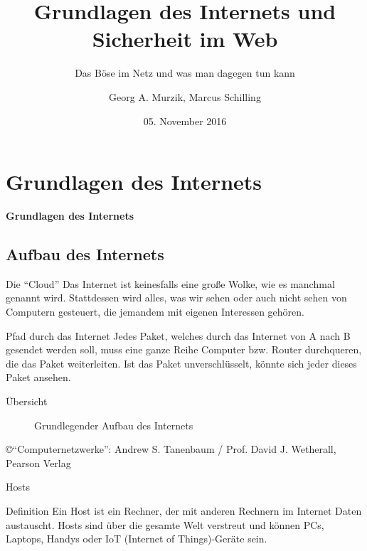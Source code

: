 \documentclass[hyperref={colorlinks,linkcolor=white}, utf8]{beamer}
\title{Grundlagen des Internets und Sicherheit im Web}
\subtitle{Das Böse im Netz und was man dagegen tun kann} %
\author{Georg A. Murzik, Marcus Schilling}
\institute{Terminal.21}
\date{05. November 2016}
\begin{document}
	\begin{frame}
		\titlepage
	\end{frame}
	
	
	\section{Grundlagen des Internets}
	\begin{frame}
		\centering \huge \textbf{Grundlagen des Internets}
	\end{frame}
	
	\subsection{Aufbau des Internets}
	\begin{frame}
		\begin{block}{Die \enquote{Cloud}}
			Das Internet ist keinesfalls eine große Wolke, wie es manchmal genannt wird. Stattdessen wird alles, was wir sehen oder auch nicht sehen von Computern gesteuert, die jemandem mit eigenen Interessen gehören.
		\end{block}
		
		\begin{block}{Pfad durch das Internet}
			Jedes Paket, welches durch das Internet von A nach B gesendet werden soll, muss eine ganze Reihe Computer bzw. Router durchqueren, die das Paket weiterleiten. Ist das Paket unverschlüsselt, könnte sich jeder dieses Paket ansehen.
		\end{block}
	\end{frame}
	
	\begin{frame}{Übersicht}
		\begin{figure}[H]
			\label{fig:Übersicht des Internets}
			\caption{Grundlegender Aufbau des Internets}
		\end{figure}
		\small \copyright \enquote{Computernetzwerke}: Andrew S. Tanenbaum / Prof. David J. Wetherall, Pearson Verlag
	\end{frame}
	
	\begin{frame}{Hosts}
		\begin{block}{Definition}
			Ein Host ist ein Rechner, der mit anderen Rechnern im Internet Daten austauscht. Hosts sind über die gesamte Welt verstreut und können PCs, Laptops, Handys oder IoT (Internet of Things)-Geräte sein.
		\end{block}
	\end{frame}
	
\end{document}
